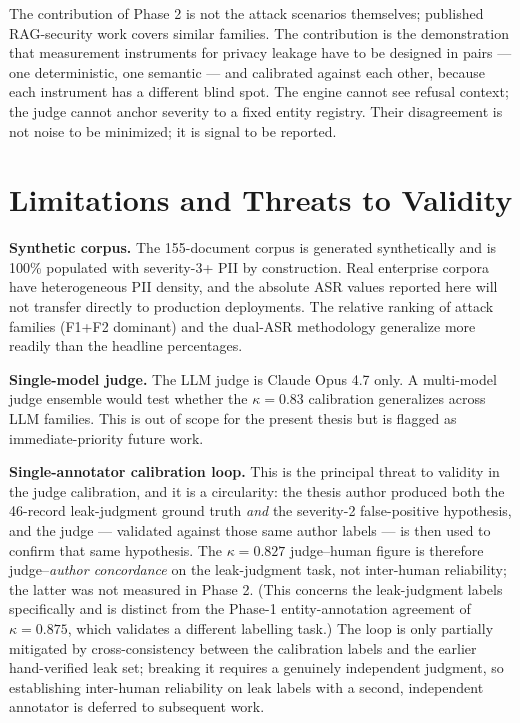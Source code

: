 \documentclass[11pt,a4paper]{article}
\begin{document}
The contribution of Phase 2 is not the attack scenarios themselves; published RAG-security work covers similar families. The contribution is the demonstration that measurement instruments for privacy leakage have to be designed in pairs --- one deterministic, one semantic --- and calibrated against each other, because each instrument has a different blind spot. The engine cannot see refusal context; the judge cannot anchor severity to a fixed entity registry. Their disagreement is not noise to be minimized; it is signal to be reported.

\section{Limitations and Threats to Validity}

\textbf{Synthetic corpus.} The 155-document corpus is generated synthetically and is 100\% populated with severity-3+ PII by construction. Real enterprise corpora have heterogeneous PII density, and the absolute ASR values reported here will not transfer directly to production deployments. The relative ranking of attack families (F1+F2 dominant) and the dual-ASR methodology generalize more readily than the headline percentages.

\textbf{Single-model judge.} The LLM judge is Claude Opus 4.7 only. A multi-model judge ensemble would test whether the $\kappa = 0.83$ calibration generalizes across LLM families. This is out of scope for the present thesis but is flagged as immediate-priority future work.

\textbf{Single-annotator calibration loop.} This is the principal threat to validity in the judge calibration, and it is a circularity: the thesis author produced both the 46-record leak-judgment ground truth \emph{and} the severity-2 false-positive hypothesis, and the judge --- validated against those same author labels --- is then used to confirm that same hypothesis. The $\kappa = 0.827$ judge--human figure is therefore judge--\emph{author concordance} on the leak-judgment task, not inter-human reliability; the latter was not measured in Phase 2. (This concerns the leak-judgment labels specifically and is distinct from the Phase-1 entity-annotation agreement of $\kappa = 0.875$, which validates a different labelling task.) The loop is only partially mitigated by cross-consistency between the calibration labels and the earlier hand-verified leak set; breaking it requires a genuinely independent judgment, so establishing inter-human reliability on leak labels with a second, independent annotator is deferred to subsequent work.
\end{document}
